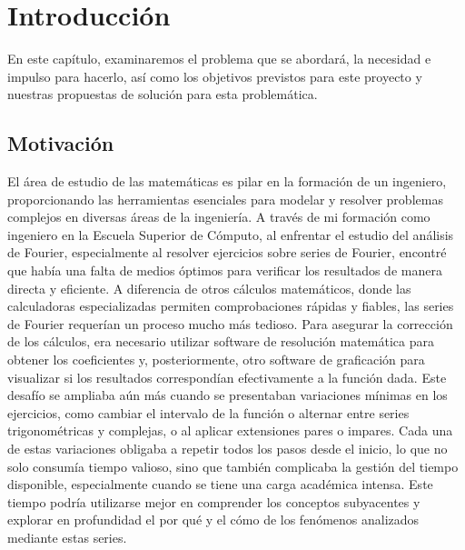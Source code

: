 \chapter{Introducción}\label{ch:Introducción}
En este capítulo, examinaremos el problema que se abordará, la necesidad e impulso para hacerlo, así como los objetivos previstos para este proyecto y nuestras propuestas de solución para esta problemática. 

\section{Motivación}
El área de estudio de las matemáticas es pilar en la formación de un ingeniero, proporcionando las herramientas esenciales para modelar y resolver problemas complejos en diversas áreas de la ingeniería. A través de mi formación como ingeniero en la Escuela Superior de Cómputo, al enfrentar el estudio del análisis de Fourier, especialmente al resolver ejercicios sobre series de Fourier, encontré que había una falta de medios óptimos para verificar los resultados de manera directa y eficiente. A diferencia de otros cálculos matemáticos, donde las calculadoras especializadas permiten comprobaciones rápidas y fiables, las series de Fourier requerían un proceso mucho más tedioso. Para asegurar la corrección de los cálculos, era necesario utilizar software de resolución matemática para obtener los coeficientes y, posteriormente, otro software de graficación para visualizar si los resultados correspondían efectivamente a la función dada. Este desafío se ampliaba aún más cuando se presentaban variaciones mínimas en los ejercicios, como cambiar el intervalo de la función o alternar entre series trigonométricas y complejas, o  al aplicar extensiones pares o impares. Cada una de estas variaciones obligaba a repetir todos los pasos desde el inicio, lo que no solo consumía tiempo valioso, sino que también complicaba la gestión del tiempo disponible, especialmente cuando se tiene una carga académica intensa. Este tiempo podría utilizarse mejor en comprender los conceptos subyacentes y explorar en profundidad el por qué y el cómo de los fenómenos analizados mediante estas series.

